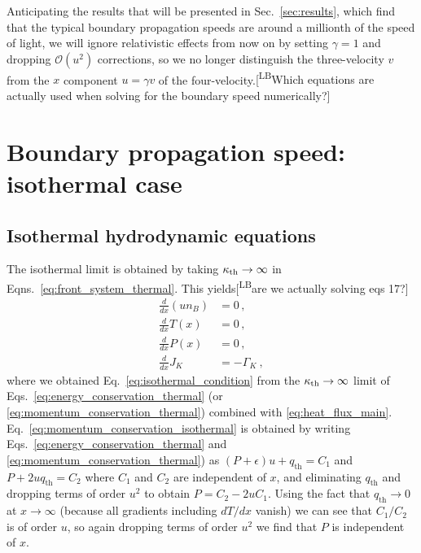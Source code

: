 \documentclass[10pt,superscriptaddress,
amsmath,aps,prc,twocolumn,nofootinbib,floatfix]{revtex4-1}
\newcommand{\mga}[1]{{\color[rgb]{0.6,0,0}#1}}
\newcommand{\LBcom}[1]{\textsf{\color{blue}[\textsuperscript{LB}#1]}}
\newcommand{\eps}{\epsilon}
\begin{document}
Anticipating the results that will be presented in Sec.~\ref{sec:results}, which find that the typical boundary propagation speeds are
around a millionth of the speed of light, we will ignore relativistic effects from now on by setting $\gamma = 1$ and dropping $\mathcal{O}(u^2)$ corrections, so we no longer distinguish the three-velocity $v$ from the $x$ component $u=\gamma v$ of the four-velocity.\LBcom{Which equations are actually used when solving for the boundary speed numerically?}

\section{Boundary propagation speed: isothermal case}
\label{sec:speed-isothermal}


\subsection{Isothermal hydrodynamic equations}
\label{sec:isothermal-equations}


The isothermal limit is obtained by taking
$\kappa_{\rm th}\to\infty$ in Eqns.~\ref{eq:front_system_thermal}.
This yields\LBcom{are we actually solving eqs 17?}
\begin{subequations}\label{eq:front_system_isothermal}
\begin{align}
\frac{d}{dx}(u n_B)&= 0\,, 
\label{eq:baryon_conservation_isothermal}\\
\frac{d}{dx}T(x) &=0\,,
\label{eq:isothermal_condition}\\
\frac{d}{dx} P(x) &=0\,,
 \label{eq:momentum_conservation_isothermal}\\
 \frac{d}{dx}J_K &= -\Gamma_K\ ,
    \label{eq:K_conservation_isothermal}
\end{align}
\end{subequations}
\mga{where we obtained Eq.~\eqref{eq:isothermal_condition} from the $\kappa_{\rm th}\to\infty$ limit of Eqs.~\eqref{eq:energy_conservation_thermal} (or 
\eqref{eq:momentum_conservation_thermal}) combined with \eqref{eq:heat_flux_main}. Eq.~\eqref{eq:momentum_conservation_isothermal} is obtained by writing
Eqs.~\eqref{eq:energy_conservation_thermal} and
\eqref{eq:momentum_conservation_thermal}) as $(P+\eps)u + q_\text{th} = C_1$ and $P+2uq_\text{th}=C_2$ where $C_1$ and $C_2$ are independent of $x$, and
eliminating $q_\text{th}$ and dropping terms of order $u^2$ to obtain $P = C_2 - 2uC_1$. Using the fact that $q_\text{th}\to 0$ at $x\to\infty$ (because all gradients including $dT/dx$ vanish) we can see that $C_1/C_2$ is of order $u$, so again dropping terms of order $u^2$ we find that $P$ is independent of $x$.}
\end{document}
